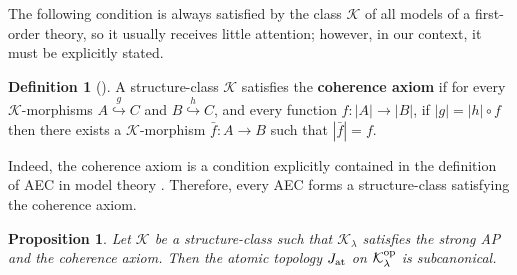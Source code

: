 \documentclass[10pt]{amsart}
\numberwithin{equation}{section}
\theoremstyle{plain}
\newtheorem{prop}[theorem]{Proposition}
\newtheorem{obs}[theorem]{Observation}
\theoremstyle{definition}
\newtheorem{definition}[theorem]{Definition}
\newcommand{\K}{\mathcal{K}}
\newcommand{\embed}{\hookrightarrow}
\newcommand{\embedge}[1]{\overset{#1}{\embed}}
\begin{document}

The following condition is always satisfied by the class $\K$ of all models of a first-order theory, so it usually receives little attention; however, in our context, it must be explicitly stated.

\begin{definition}[\cite{LiRo16}]
A structure-class $\K$ satisfies the {\bf coherence axiom} if for every $\K$-morphisms $A\embedge{g}C$ and $B\embedge{h}C$, and every function $f\colon |A|\to|B|$, if $|g|=|h|\circ f$ then there exists a $\K$-morphism $\bar{f}\colon A\to B$ such that $|\bar{f}|=f$.
\end{definition}

Indeed, the coherence axiom is a condition explicitly contained in the definition of AEC in model theory \cite{She09}.
Therefore, every AEC forms a structure-class satisfying the coherence axiom.



\begin{prop}\label{prop:stAP-subcanonical}
Let $\mathcal{K}$ be a structure-class such that $\K_\lambda$ satisfies the strong AP and the coherence axiom.
Then the atomic topology $J_{\rm at}$ on $\mathcal{K}_\lambda^{\rm op}$ is subcanonical.
\end{prop}
\end{document}
